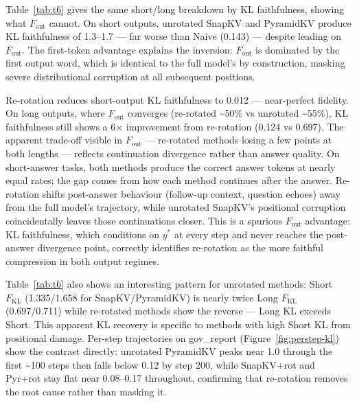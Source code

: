 \documentclass[10pt,letterpaper]{article}
\begin{document}
Table~\ref{tab:t6} gives the same short/long breakdown by KL faithfulness, showing
what \(F_{\text{out}}\) cannot.
On short outputs, unrotated SnapKV and PyramidKV produce KL faithfulness
of 1.3--1.7 --- far worse than Naive (0.143) --- despite leading on
\(F_{\text{out}}\). The first-token advantage explains the inversion:
\(F_{\text{out}}\) is dominated by the first output word, which is
identical to the full model's by construction, masking severe
distributional corruption at all subsequent positions. 

Re-rotation reduces short-output KL faithfulness to 0.012 --- near-perfect fidelity.
On long outputs, where \(F_{\text{out}}\) converges (re-rotated
\textasciitilde50\% vs unrotated \textasciitilde55\%), KL faithfulness
still shows a 6× improvement from re-rotation (0.124 vs 0.697). The
apparent trade-off visible in \(F_{\text{out}}\) --- re-rotated methods
losing a few points at both lengths --- reflects continuation divergence
rather than answer quality. On short-answer tasks, both methods produce
the correct answer tokens at nearly equal rates; the gap comes from how
each method continues after the answer. Re-rotation shifts post-answer
behaviour (follow-up context, question echoes) away from the full
model's trajectory, while unrotated SnapKV's positional corruption
coincidentally leaves those continuations closer. This is a spurious
\(F_{\text{out}}\) advantage: KL faithfulness, which conditions on
\(y^*\) at every step and never reaches the post-answer divergence
point, correctly identifies re-rotation as the more faithful
compression in both output regimes.

Table~\ref{tab:t6} also shows an interesting pattern for unrotated methods: Short
\(F_{\text{KL}}\) (1.335/1.658 for SnapKV/PyramidKV) is nearly twice
Long \(F_{\text{KL}}\) (0.697/0.711) while re-rotated methods
show the reverse --- Long KL exceeds Short. This apparent KL recovery is
specific to methods with high Short KL from positional damage. Per-step
trajectories on gov\_report (Figure~\ref{fig:perstep-kl}) show the
contrast directly: unrotated PyramidKV peaks near 1.0 through the first
\textasciitilde100 steps then falls below 0.12 by step 200, while
SnapKV+rot and Pyr+rot stay flat near 0.08--0.17 throughout, confirming
that re-rotation removes the root cause rather than masking it.
\end{document}
